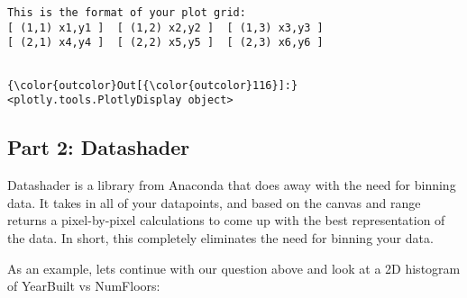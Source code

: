 \documentclass[11pt]{article}
\begin{document}
    \begin{Verbatim}[commandchars=\\\{\}]
This is the format of your plot grid:
[ (1,1) x1,y1 ]  [ (1,2) x2,y2 ]  [ (1,3) x3,y3 ]
[ (2,1) x4,y4 ]  [ (2,2) x5,y5 ]  [ (2,3) x6,y6 ]


    \end{Verbatim}

\begin{Verbatim}[commandchars=\\\{\}]
{\color{outcolor}Out[{\color{outcolor}116}]:} <plotly.tools.PlotlyDisplay object>
\end{Verbatim}
            
    \subsection{Part 2: Datashader}\label{part-2-datashader}

Datashader is a library from Anaconda that does away with the need for
binning data. It takes in all of your datapoints, and based on the
canvas and range returns a pixel-by-pixel calculations to come up with
the best representation of the data. In short, this completely
eliminates the need for binning your data.

As an example, lets continue with our question above and look at a 2D
histogram of YearBuilt vs NumFloors:
\end{document}
